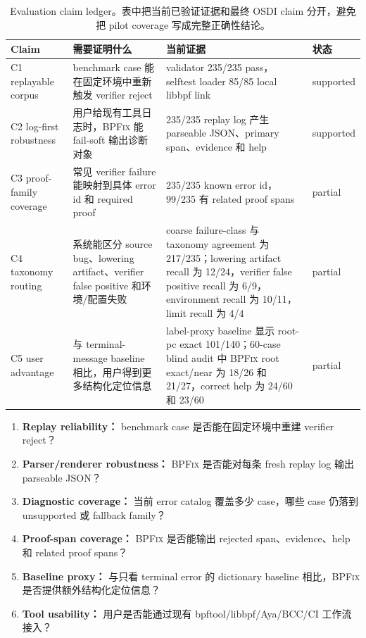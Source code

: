 \documentclass[letterpaper,twocolumn,10pt]{article}
\newcommand{\sys}{\textsc{BPFix}\xspace}
\begin{document}
\begin{table}[t]
\centering
\small
\caption{Evaluation claim ledger。表中把当前已验证证据和最终 OSDI claim 分开，避免把 pilot coverage 写成完整正确性结论。}
\label{tab:eval-claims}
\begin{tabularx}{\textwidth}{@{}l X X l@{}}
\toprule
Claim & 需要证明什么 & 当前证据 & 状态 \\
\midrule
C1 replayable corpus & benchmark case 能在固定环境中重新触发 verifier reject & validator 235/235 pass，selftest loader 85/85 local libbpf link & supported \\
C2 log-first robustness & 用户给现有工具日志时，\sys 能 fail-soft 输出诊断对象 & 235/235 replay log 产生 parseable JSON、primary span、evidence 和 help & supported \\
C3 proof-family coverage & 常见 verifier failure 能映射到具体 error id 和 required proof & 235/235 known error id，99/235 有 related proof spans & partial \\
C4 taxonomy routing & 系统能区分 source bug、lowering artifact、verifier false positive 和环境/配置失败 & coarse failure-class 与 taxonomy agreement 为 217/235；lowering artifact recall 为 12/24，verifier false positive recall 为 6/9，environment recall 为 10/11，limit recall 为 4/4 & partial \\
C5 user advantage & 与 terminal-message baseline 相比，用户得到更多结构化定位信息 & label-proxy baseline 显示 root-pc exact 101/140；60-case blind audit 中 \sys root exact/near 为 18/26 和 21/27，correct help 为 24/60 和 23/60 & partial \\
\bottomrule
\end{tabularx}
\end{table}

\begin{enumerate}
  \item \textbf{Replay reliability：} benchmark case 是否能在固定环境中重建 verifier reject？
  \item \textbf{Parser/renderer robustness：} \sys 是否能对每条 fresh replay log 输出 parseable JSON？
  \item \textbf{Diagnostic coverage：} 当前 error catalog 覆盖多少 case，哪些 case 仍落到 unsupported 或 fallback family？
  \item \textbf{Proof-span coverage：} \sys 是否能输出 rejected span、evidence、help 和 related proof spans？
  \item \textbf{Baseline proxy：} 与只看 terminal error 的 dictionary baseline 相比，\sys 是否提供额外结构化定位信息？
  \item \textbf{Tool usability：} 用户是否能通过现有 bpftool/libbpf/Aya/BCC/CI 工作流接入？
\end{enumerate}
\end{document}

